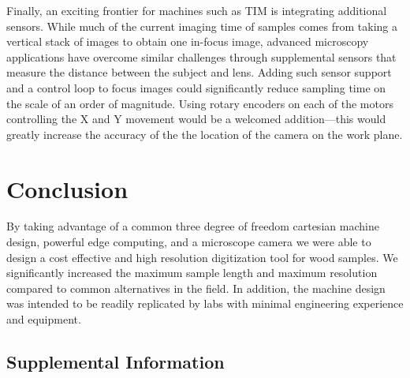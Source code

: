 \documentclass[a4paper,12pt]{article}
\begin{document}
Finally, an exciting frontier for machines such as TIM is integrating additional sensors. While much of the current imaging time of samples comes from taking a vertical stack of images to obtain one in-focus image, advanced microscopy applications have overcome similar challenges through supplemental sensors that measure the distance between the subject and lens.
Adding such sensor support and a control loop to focus images could significantly reduce sampling time on the scale of an order of magnitude. 
Using rotary encoders on each of the motors controlling the X and Y movement would be a welcomed addition---this would greatly increase the 
accuracy of the the location of the camera on the work plane.  

\section{Conclusion} %
By taking advantage of a common three degree of freedom cartesian machine design, powerful edge computing, and a microscope camera we were able to design a cost effective and high resolution digitization tool for wood samples. 
We significantly increased the maximum sample length and maximum resolution compared to common alternatives in the field. 
In addition, the machine design was intended to be readily replicated by labs with minimal engineering experience and equipment. 

\subsection{Supplemental Information}
\end{document}
